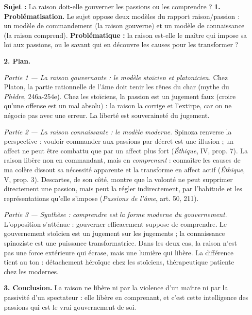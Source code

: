 \documentclass[11pt]{article}
\begin{document}
\begin{exoresolu}
\textbf{Sujet :} La raison doit-elle gouverner les passions ou les comprendre ?
\tcblower
\textbf{1. Problématisation.} Le sujet oppose deux modèles du rapport raison/passion : un modèle de commandement (la raison gouverne) et un modèle de connaissance (la raison comprend). \textbf{Problématique :} la raison est-elle le maître qui impose sa loi aux passions, ou le savant qui en découvre les causes pour les transformer ?

\textbf{2. Plan.}

\emph{Partie 1 — La raison gouvernante : le modèle stoïcien et platonicien.} Chez Platon, la partie rationnelle de l'âme doit tenir les rênes du char (mythe du \emph{Phèdre}, 246a-254e). Chez les stoïciens, la passion est un jugement faux (croire qu'une offense est un mal absolu) : la raison la corrige et l'extirpe, car on ne négocie pas avec une erreur. La liberté est souveraineté du jugement.

\emph{Partie 2 — La raison connaissante : le modèle moderne.} Spinoza renverse la perspective : vouloir commander aux passions par décret est une illusion ; un affect ne peut être combattu que par un affect plus fort (\emph{Éthique}, IV, prop. 7). La raison libère non en commandant, mais en \emph{comprenant} : connaître les causes de ma colère dissout sa nécessité apparente et la transforme en affect actif (\emph{Éthique}, V, prop. 3). Descartes, de son côté, montre que la volonté ne peut supprimer directement une passion, mais peut la régler indirectement, par l'habitude et les représentations qu'elle s'impose (\emph{Passions de l'âme}, art. 50, 211).

\emph{Partie 3 — Synthèse : comprendre est la forme moderne du gouvernement.} L'opposition s'atténue : gouverner efficacement suppose de comprendre. Le gouvernement stoïcien est un jugement sur les jugements ; la connaissance spinoziste est une puissance transformatrice. Dans les deux cas, la raison n'est pas une force extérieure qui écrase, mais une lumière qui libère. La différence tient au ton : détachement héroïque chez les stoïciens, thérapeutique patiente chez les modernes.

\textbf{3. Conclusion.} La raison ne libère ni par la violence d'un maître ni par la passivité d'un spectateur : elle libère en comprenant, et c'est cette intelligence des passions qui est le vrai gouvernement de soi.
\end{exoresolu}
\end{document}
